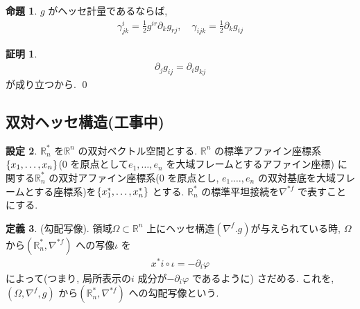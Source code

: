 \documentclass[10pt, fleqn, label-section=none]{bxjsarticle}
\theoremstyle{definition}
\newtheorem{dfn}{定義}[section]
\newtheorem{prop}[dfn]{命題}
\newtheorem{setting}[dfn]{設定}
\newtheorem*{pf*}{証明}
\newcommand{\cbra}[1]{\mleft\{#1\mright\}}
\renewcommand{\;}{\, ; \,}
\begin{document}
\begin{prop}$g$ がヘッセ計量であるならば, 
\begin{align*}\gamma^i_{jk} = \frac{1}{2} g^{ir} \partial_k g_{rj}, \quad  \gamma_{ijk} =  \frac{1}{2} \partial_k g_{ij}  \end{align*}
\end{prop}
\begin{pf*}
\begin{align*} \partial_j g_{ij} = \partial_i g_{kj} \end{align*}
が成り立つから. 
\qed
\end{pf*}



\subsection{双対ヘッセ構造(工事中)}

\begin{setting}$\mathbb R^*_n$ を$\mathbb R^n$ の双対ベクトル空間とする. $\mathbb R^n$ の標準アファイン座標系$\cbra{x_1, \ldots, x_n} $($0$ を原点として$e_1, \ldots, e_n$ を大域フレームとするアファイン座標) に関する$\mathbb R^*_n$ の双対アファイン座標系($0$ を原点とし, $e_1. \ldots, e_n$ の双対基底を大域フレームとする座標系)を$\cbra{x^*_1, \ldots, x^*_n}$ とする. $\mathbb R^*_n$ の標準平坦接続を$\nabla^{*f}$ で表すことにする. 

\end{setting}

\begin{dfn}(勾配写像). 領域$\Omega \subset \mathbb R^n$ 上にヘッセ構造$(\nabla^f . g)$が与えられている時, $\Omega$ から$(\mathbb R^*_n, \nabla^{*f})$ への写像$\iota$ を
\begin{align*} x^*i \circ \iota = - \partial_i \varphi \end{align*}
によって(つまり, 局所表示の$i$ 成分が$- \partial_i \varphi$ であるように) さだめる. これを, $(\Omega, \nabla^f, g)$ から$(\mathbb R^*_n , \nabla^{*f})$ への勾配写像という. 
\end{dfn}
\end{document}
